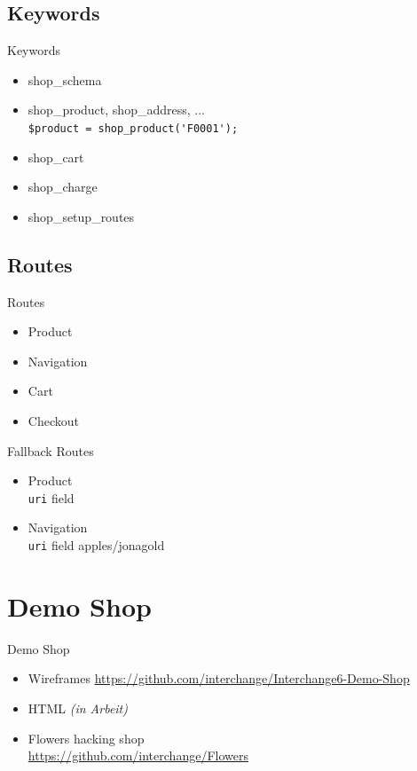 \subsection{Keywords}
\begin{frame}[fragile]{Keywords}
\begin{itemize}
\item shop\_schema
\item shop\_product, shop\_address, ...\\
\verb|$product = shop_product('F0001');|
\item shop\_cart
\item shop\_charge
\item shop\_setup\_routes
\end{itemize}
\end{frame}

\subsection{Routes}
\begin{frame}{Routes}
\begin{itemize}
\item Product
\item Navigation
\item Cart
\item Checkout
\end{itemize}
\end{frame}

\begin{frame}[fragile]{Fallback Routes}
\begin{itemize}
\item Product\\
\verb|uri| field
\item Navigation\\
\verb|uri| field
apples/jonagold
\end{itemize}
\end{frame}

\section{Demo Shop}
\begin{frame}{Demo Shop}
\begin{itemize}
\item Wireframes
  \url{https://github.com/interchange/Interchange6-Demo-Shop}
\item HTML \textit{(in Arbeit)}
\item Flowers hacking shop \\
  \url{https://github.com/interchange/Flowers}
\end{itemize}
\end{frame}


